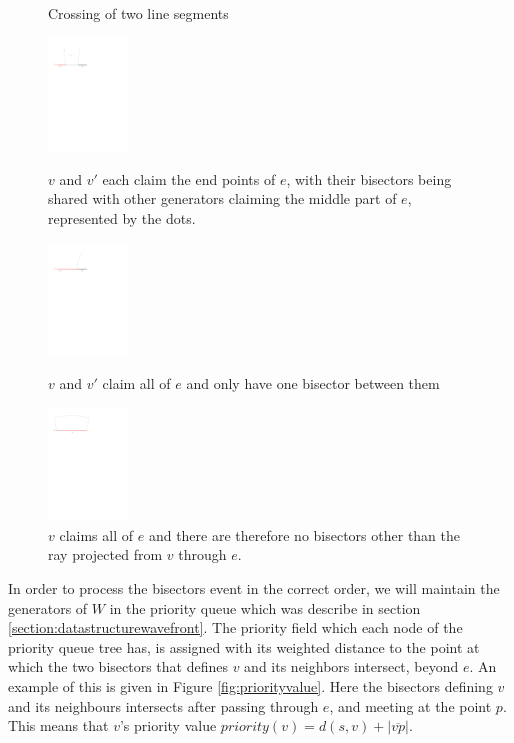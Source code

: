 \begin{figure}[H]
	\caption{Crossing of two line segments}
		\includegraphics[height=3cm]{figures/vandvprimesharingedge.pdf}
		\caption{$v$ and $v'$ each claim the end points of $e$, with their bisectors being shared with other generators claiming the middle part of $e$, represented by the dots.}
		\label{fig:vandvprimesharingedge}
	\endminipage\hfill
		\includegraphics[height=3cm]{figures/vandvprimeallofe.pdf}
		\caption{$v$ and $v'$ claim all of $e$ and only have one bisector between them}
		\label{fig:vandvprimeallofe}
	\endminipage\hfill
	\centering
		\includegraphics[height=3cm]{figures/visallofe.pdf}
		\caption{$v$ claims all of $e$ and there are therefore no bisectors other than the ray projected from $v$ through $e$.}
		\label{fig:visallofe}
		\endminipage\hfill
\end{figure}

In order to process the bisectors event in the correct order, we will maintain the generators of $W$ in the priority queue which was 
describe in section \ref{section:datastructurewavefront}. The priority field which each node of the priority queue tree has, is 
assigned with its weighted distance to the point at which the two bisectors that defines $v$ and its neighbors intersect, beyond $e$. 
An example of this is given in Figure \ref{fig:priorityvalue}. Here the bisectors defining $v$ and its neighbours intersects after 
passing through $e$, and meeting at the point $p$. This means that $v$'s priority value $priority(v) = d(s,v) + |\overline{vp}|$.

